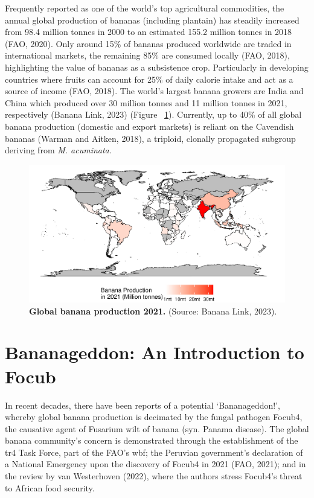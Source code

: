 Frequently reported as one of the world’s top agricultural commodities, the annual global production of bananas (including plantain) has steadily increased from 98.4 million tonnes in 2000 to an estimated 155.2 million tonnes in 2018 (\ac{FAO}, 2020). Only around 15\% of bananas produced worldwide are traded in international markets, the remaining 85\% are consumed locally (\ac{FAO}, 2018), highlighting the value of bananas as a subsistence crop. Particularly in developing countries where fruits can account for 25\% of daily calorie intake and act as a source of income (\ac{FAO}, 2018). The world’s largest banana growers are India and China which produced over 30 million tonnes and 11 million tonnes in 2021, respectively (Banana Link, 2023) (Figure ~\ref{fig:bananaProdMap}).  Currently, up to 40\% of all global banana production (domestic and export markets) is reliant on the Cavendish bananas (Warman and Aitken, 2018), a triploid, clonally propagated subgroup deriving from \textit{M. acuminata}.

\begin{figure}[h!]
    \centering
    \includegraphics[width=15cm]{Figures/BananaProdMap.pdf}
    \caption[Global banana production, 2021]{\textbf{Global banana production 2021.} (Source: Banana Link, 2023).}
    \label{fig:bananaProdMap}
\end{figure}



\section{Bananageddon: An Introduction to \acl{Focub}}

In recent decades, there have been reports of a potential ‘Bananageddon!’, whereby global banana production is decimated by the fungal pathogen \ac{Focub4}, the causative agent of Fusarium wilt of banana (syn. Panama disease). The global banana community’s concern is demonstrated through the establishment of the \acs{tr4} Task Force, part of the \ac{FAO}'s \ac{wbf}; the Peruvian government’s declaration of a National Emergency upon the discovery of \ac{Focub4} in 2021 (FAO, 2021); and in the review by van Westerhoven \et (2022), where the authors stress \ac{Focub4}'s threat to African food security.   


